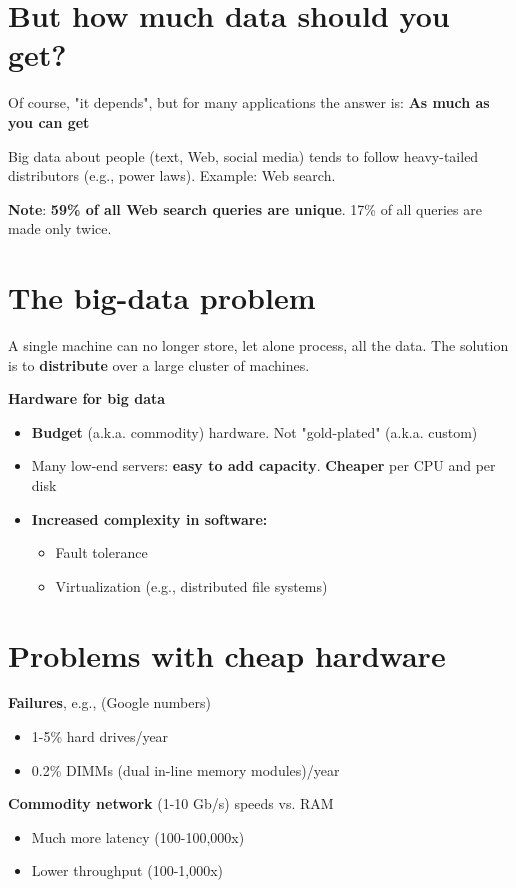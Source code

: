 \documentclass[11pt]{article}
\begin{document}
\section*{But how much data should you get?}

Of course, "it depends", but for many applications the answer is: \textbf{As much as you can get}

Big data about people (text, Web, social media) tends to follow heavy-tailed distributors (e.g., power laws). Example: Web search. 

\textbf{Note}: \textbf{59\% of all Web search queries are unique}. 17\% of all queries are made only twice. 

\section*{The big-data problem}

A single machine can no longer store, let alone process, all the data. The solution is to \textbf{distribute} over a large cluster of machines. 

\textbf{Hardware for big data}
\begin{itemize}
	\item \textbf{Budget} (a.k.a. commodity) hardware. Not "gold-plated" (a.k.a. custom)
	\item Many low-end servers: \textbf{easy to add capacity}. \textbf{Cheaper} per CPU and per disk
	\item \textbf{Increased complexity in software:}
		\begin{itemize}
			\item Fault tolerance
			\item Virtualization (e.g., distributed file systems)
		\end{itemize}
\end{itemize}

\section*{Problems with cheap hardware}

\textbf{Failures}, e.g., (Google numbers)
\begin{itemize}
	\item 1-5\% hard drives/year
	\item 0.2\% DIMMs (dual in-line memory modules)/year
\end{itemize}

\textbf{Commodity network} (1-10 Gb/s) speeds vs. RAM
\begin{itemize}
	\item Much more latency (100-100,000x)
	\item Lower throughput (100-1,000x)
\end{itemize}
\end{document}
